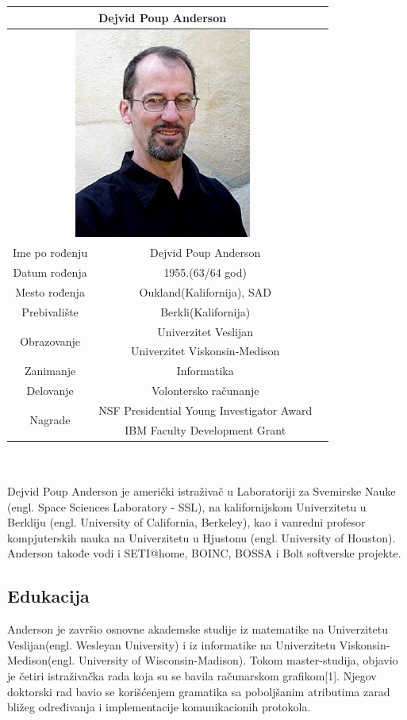 \documentclass[titlepage, 12pt]{article}
\begin{document}
\begin{tabular}{|c|c|c|}
\hline
\multicolumn{2}{|c|}{Dejvid Poup Anderson}\\
\hline
\multicolumn{2}{|c|}{\includegraphics[width=220px,height=261px]{dejvid.eps}}\\

\hline
Ime po rođenju & Dejvid Poup Anderson \\
\hline
Datum rođenja & 1955.(63/64 god)\\
\hline
Mesto rođenja & Oukland(Kalifornija), SAD\\
\hline
Prebivalište & Berkli(Kalifornija)\\
\hline
\multirow{2}{*}{Obrazovanje}&Univerzitet Veslijan\\
&Univerzitet Viskonsin-Medison\\
\hline 
Zanimanje & Informatika\\
\hline
Delovanje & Volontersko računanje \\
\hline
\multirow{2}{*}{Nagrade}&NSF Presidential Young Investigator Award\\
&IBM Faculty Development Grant
\\
\hline
\end{tabular}
\\
\\
\newline
Dejvid Poup Anderson je američki istraživač u Laboratoriji za Svemirske Nauke (engl. Space Sciences Laboratory - SSL), na kalifornijskom Univerzitetu u Berkliju (engl. University of California, Berkeley), kao i vanredni profesor kompjuterskih nauka na Univerzitetu u Hjustonu (engl. University of Houston). Anderson takođe vodi i SETI@home, BOINC, BOSSA i Bolt softverske projekte.
\subsection{Edukacija}
Anderson je završio osnovne akademske studije iz matematike na Univerzitetu Veslijan(engl. Wesleyan University) i iz informatike na Univerzitetu Viskonsin-Medison(engl. University of Wisconsin-Madison). Tokom master-studija, objavio je četiri istraživačka rada koja su se bavila računarskom grafikom[1]. Njegov doktorski rad bavio se korišćenjem gramatika sa poboljšanim atributima zarad bližeg određivanja i implementacije komunikacionih protokola.
\end{document}
